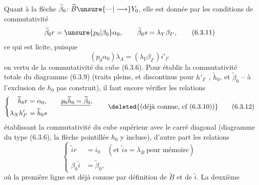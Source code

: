 Quant à la flèche $\widetilde\beta_0\colon\widetilde B\unsure{\text{---}|\longrightarrow}Y_0$, elle est
donnée par les conditions de commutativité
\[
 \widetilde\beta_0r=\unsure{p_0|\beta_0}\alpha_0,\qquad
 \widetilde\beta_0s=\lambda_Y\beta_{I'},\tag*{(6.3.11)}
\]
ce qui est  licite, puisque
\[
 (p_0\alpha_0)\lambda_A=(\lambda_Y\beta_{I'})i'_{I'}
\]
en vertu de la commutativité du
cube (6.3.6). Pour établir la commutativité
totale du diagramme (6.3.9)\unsure{,}
(traits pleins, et \unsure{,} discontinus
pour $h'_{I'}$ , $\widetilde h_0$, et $\widetilde\beta_0$ -- à l'exclusion
de $h_0$ pas  construit), il faut
encore vérifier  les relations
\[
 \left\{\begin{aligned}
 \widetilde h_0r&=\alpha_0,\qquad \underline{p_0\widetilde h_0=\widetilde\beta_0},\\
 \lambda_Xh'_{I'}&=\widetilde h_0s
 \end{aligned}\right.\qquad
 \deleted{\text{(déjà connue, cf }(6.3.10)\text{)}}
 \tag*{(6.3.12)}
\]
établissant la commutativité du
cube supérieur avec le carré diagonal
(diagramme du type (6.3.6), la flèche
pointillée $h_0$ y incluse), d'autre
part les relations
\[
 \left\{\begin{aligned}
 \widetilde i r&=i_0\quad(\text{et }\widetilde i s=\lambda_B\ \text{pour mémoire})\\
 \beta_0\widetilde i&=\widetilde\beta_0,
 \end{aligned}\right.\tag*{(6.3.13)}
\]
où la première ligne est déjà connue
par définition de $\widetilde B$ et de $\widetilde i$. La deuxième


